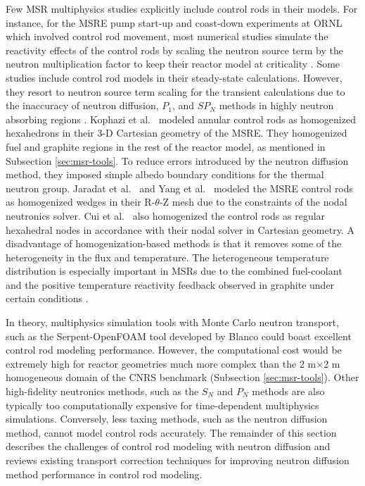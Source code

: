Few \gls{MSR} multiphysics studies explicitly include control rods in their models. For instance,
for the \gls{MSRE} pump start-up and coast-down experiments at \gls{ORNL} which involved control
rod movement, most numerical studies simulate the reactivity effects of the control rods by scaling
the neutron source term by the neutron multiplication factor to keep their reactor model at
criticality \cite{delpech_benchmark_2003, krepel_dyn3d-msr_2007}. Some studies include control rod
models in their steady-state calculations. However, they resort to neutron source term scaling for
the transient calculations due to the inaccuracy of neutron diffusion, $P_1$, and $SP_N$ methods in
highly neutron absorbing regions \cite{kophazi_development_2009, jaradat_development_2021,
yang_development_2022}. Kophazi et al.\ \cite{kophazi_development_2009} modeled annular control rods
as homogenized hexahedrons in their 3-D Cartesian geometry of the \gls{MSRE}. They
homogenized fuel and graphite regions in the rest of the reactor model, as mentioned in Subsection
\ref{sec:msr-tools}. To reduce errors introduced by the neutron diffusion method, they imposed
simple albedo boundary conditions for the thermal neutron group. Jaradat et al.\
\cite{jaradat_development_2021} and Yang et al.\ \cite{yang_development_2022} modeled the
\gls{MSRE} control rods as homogenized wedges in their R-$\theta$-Z mesh due to the constraints of
the nodal neutronics solver. Cui et al.\ \cite{cui_development_2021} also homogenized the control
rods as regular hexahedral nodes in accordance with their nodal solver in Cartesian geometry. A
disadvantage of homogenization-based methods is that it removes some of the heterogeneity in the
flux and temperature. The heterogeneous temperature distribution is especially important in
\glspl{MSR} due to the combined fuel-coolant and the positive temperature reactivity feedback
observed in graphite under certain conditions \cite{mathieu_thorium_2006}.

In theory, multiphysics simulation tools with Monte Carlo neutron transport, such as the
Serpent-OpenFOAM tool developed by Blanco \cite{blanco_neutronic_2020} could boast excellent
control rod modeling performance. However, the computational cost would be extremely high for
reactor geometries much more complex than the 2 m$\times$2 m homogeneous domain of the CNRS
benchmark (Subsection \ref{sec:msr-tools}). Other high-fidelity neutronics methods, such as the
$S_N$ and $P_N$ methods are also typically too computationally expensive for time-dependent
multiphysics simulations. Conversely, less taxing methods, such as the neutron diffusion
method, cannot model control rods accurately. The remainder of this section describes the
challenges of control rod modeling with neutron diffusion and reviews existing transport
correction techniques for improving neutron diffusion method performance in control rod modeling.

